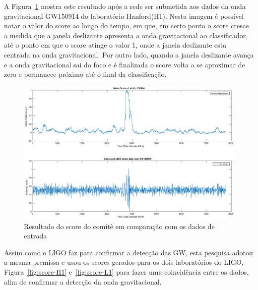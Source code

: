 A Figura~\ref{fig:detection} mostra este resultado após a rede ser submetida aos dados da onda gravitacional GW150914 do laboratório Hanford(H1). Nesta imagem é possível notar o valor do score ao longo do tempo, em que, em certo ponto o score cresce a medida que a janela deslizante apresenta a onda gravitacional ao classificador, até o ponto em que o score atinge o valor 1, onde a janela deslizante esta centrada na onda gravitacional. Por outro lado, quando a janela deslizante avança e a onda gravitacional sai do foco e é finalizada o score volta a se aproximar de zero e permanece próximo até o final da classificação.

\begin{figure}[H]
\centering
\includegraphics[width=1\textwidth]{figuras/detection.eps}
\caption{Resultado do score do comitê em comparação com os dados de entrada}
\label{fig:detection}
\end{figure}

Assim como o LIGO faz para confirmar a detecção das GW, esta pesquisa adotou a mesma premissa e usou os scores gerados para os dois laboratórios do LIGO, Figura~\ref{fig:score-H1} e~\ref{fig:score-L1} para fazer uma coincidência entre os dados, afim de confirmar a detecção da onda gravitacional.

